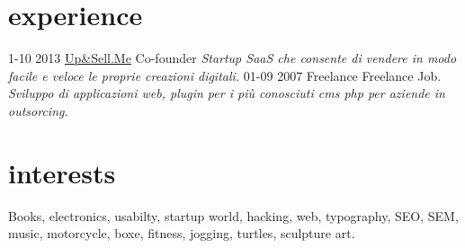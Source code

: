 \documentclass[print]{cv}
\begin{document}
\section{experience}

\begin{entrylist}
  \entry
    {1-10 2013}
     {\href{http://www.upandsell.me}{Up\&Sell.Me}}
    {Co-founder}
    {\emph{Startup SaaS che consente di vendere in modo facile e veloce le proprie
    creazioni digitali. }}
  \entry
    {01-09 2007}
    {Freelance}
    {Freelance Job.}
    {\emph{Sviluppo di applicazioni web, plugin per i più conosciuti cms php per
    aziende in outsorcing.}}
\end{entrylist}

\section{interests}

Books, electronics, usabilty, startup world, hacking, web, typography, SEO, SEM, music, motorcycle, boxe, fitness, jogging,
turtles, sculpture art.
\end{document}
